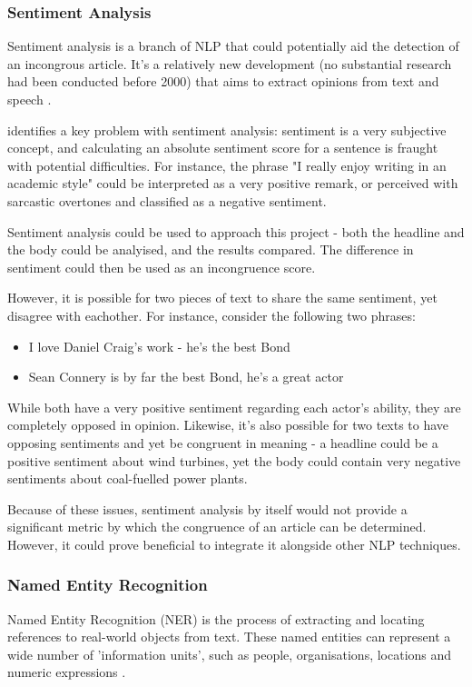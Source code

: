 \subsubsection{Sentiment Analysis}\label{lit:sentiment-analysis}
Sentiment analysis is a branch of NLP that could potentially aid the detection of an incongrous article. It's a relatively new development (no substantial research had been conducted before 2000) that aims to extract opinions from text and speech \cite{liu2012}.

 identifies a key problem with sentiment analysis: sentiment is a very subjective concept, and calculating an absolute sentiment score for a sentence is fraught with potential difficulties. For instance, the phrase "I really enjoy writing in an academic style" could be interpreted as a very positive remark, or perceived with sarcastic overtones and classified as a negative sentiment.

Sentiment analysis could be used to approach this project - both the headline and the body could be analyised, and the results compared. The difference in sentiment could then be used as an incongruence score.

However, it is possible for two pieces of text to share the same sentiment, yet disagree with eachother. For instance, consider the following two phrases:

\begin{itemize}
	\item I love Daniel Craig's work - he's the best Bond
	\item Sean Connery is by far the best Bond, he's a great actor
\end{itemize}

While both have a very positive sentiment regarding each actor's ability, they are completely opposed in opinion. Likewise, it's also possible for two texts to have opposing sentiments and yet be congruent in meaning - a headline could  be a positive sentiment about wind turbines, yet the body could contain very negative sentiments about coal-fuelled power plants.

Because of these issues, sentiment analysis by itself would not provide a significant metric by which the congruence of an article can be determined. However, it could prove beneficial to integrate it alongside other NLP techniques. 

\subsubsection{Named Entity Recognition}
Named Entity Recognition (NER) is the process of extracting and locating references to real-world objects from text. These named entities can represent a wide number of 'information units', such as people, organisations, locations and numeric expressions \cite{nadeau2007}. 

